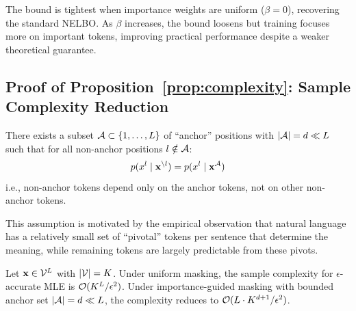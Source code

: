 \begin{corollary}[Tightness]
The bound is tightest when importance weights are uniform ($\beta = 0$), recovering the standard NELBO. As $\beta$ increases, the bound loosens but training focuses more on important tokens, improving practical performance despite a weaker theoretical guarantee.
\end{corollary}

\subsection{Proof of Proposition~\ref{prop:complexity}: Sample Complexity Reduction}
\label{app:complexity-proof}

\begin{assumption}
\label{assm:anchor}
There exists a subset $\mathcal{A} \subset \{1, \ldots, L\}$ of ``anchor'' positions with $|\mathcal{A}| = d \ll L$ such that for all non-anchor positions $l \notin \mathcal{A}$:
\begin{equation}
    p(x^l \mid \mathbf{x}^{\setminus l}) = p(x^l \mid \mathbf{x}^{\mathcal{A}})
\end{equation}
i.e., non-anchor tokens depend only on the anchor tokens, not on other non-anchor tokens.
\end{assumption}

This assumption is motivated by the empirical observation that natural language has a relatively small set of ``pivotal'' tokens per sentence that determine the meaning, while remaining tokens are largely predictable from these pivots.

\begin{proposition}
Let $\mathbf{x} \in \mathcal{V}^L$ with $|\mathcal{V}| = K$. Under uniform masking, the sample complexity for $\epsilon$-accurate MLE is $\mathcal{O}(K^L/\epsilon^2)$. Under importance-guided masking with bounded anchor set $|\mathcal{A}| = d \ll L$, the complexity reduces to $\mathcal{O}(L \cdot K^{d+1}/\epsilon^2)$.
\end{proposition}


